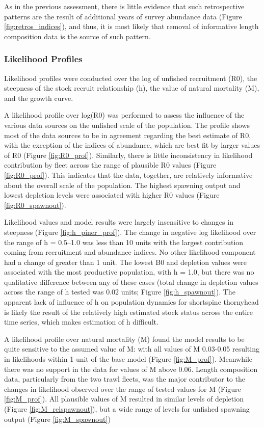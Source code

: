 \documentclass[11pt,
  english,
  letterpaper,
]{article}
\begin{document}
As in the previous assessment, there is little evidence that such retrospective patterns are the result of additional years of survey abundance data (Figure \ref{fig:retros_indices}), and thus, it is most likely that removal of informative length composition data is the source of such pattern.

\hypertarget{likelihood-profiles}{%
\subsubsection{Likelihood Profiles}\label{likelihood-profiles}}

Likelihood profiles were conducted over the log of unfished recruitment (R0), the steepness of the stock recruit relationship (h), the value of natural mortality (M), and the growth curve.

A likelihood profile over log(R0) was performed to assess the influence of the various data sources on the unfished scale of the population. The profile shows most of the data sources to be in agreement regarding the best estimate of R0, with the exception of the indices of abundance, which are best fit by larger values of R0 (Figure \ref{fig:R0_prof}). Similarly, there is little inconsistency in likelihood contribution by fleet across the range of plausible R0 values (Figure \ref{fig:R0_prof}). This indicates that the data, together, are relatively informative about the overall scale of the population. The highest spawning output and lowest depletion levels were associated with higher R0 values (Figure \ref{fig:R0_spawnout}).

Likelihood values and model results were largely insensitive to changes in steepness (Figure \ref{fig:h_piner_prof}). The change in negative log likelihood over the range of h = 0.5--1.0 was less than 10 units with the largest contribution coming from recruitment and abundance indices. No other likelihood component had a change of greater than 1 unit. The lowest B0 and depletion values were associated with the most productive population, with h = 1.0, but there was no qualitative difference between any of these cases (total change in depletion values across the range of h tested was 0.02 units; Figure \ref{fig:h_spawnout}). The apparent lack of influence of h on population dynamics for shortspine thornyhead is likely the result of the relatively high estimated stock status across the entire time series, which makes estimation of h difficult.

A likelihood profile over natural mortality (M) found the model results to be quite sensitive to the assumed value of M: with all values of M 0.03-0.05 resulting in likelihoods within 1 unit of the base model (Figure \ref{fig:M_prof}). Meanwhile there was no support in the data for values of M above 0.06. Length composition data, particularly from the two trawl fleets, was the major contributor to the changes in likelihood observed over the range of tested values for M (Figure \ref{fig:M_prof}). All plausible values of M resulted in similar levels of depletion (Figure \ref{fig:M_relspawnout}), but a wide range of levels for unfished spawning output (Figure \ref{fig:M_spawnout})
\end{document}
